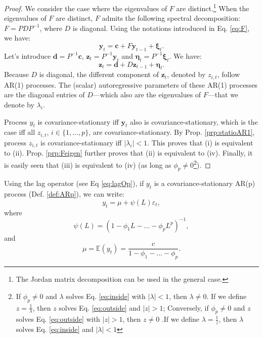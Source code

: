 \documentclass[
  11pt,
]{book}
\theoremstyle{definition}
\theoremstyle{definition}
\theoremstyle{definition}
\theoremstyle{definition}
\theoremstyle{remark}
\begin{document}
\begin{proof}
We consider the case where the eigenvalues of \(F\) are distinct.\footnote{The Jordan matrix decomposition can be used in the general case.} When the eigenvalues of \(F\) are distinct, \(F\) admits the following spectral decomposition: \(F = PDP^{-1}\), where \(D\) is diagonal. Using the notations introduced in Eq. \eqref{eq:F}, we have:
\[
\mathbf{y}_{t} = \mathbf{c} + F \mathbf{y}_{t-1} + \boldsymbol\xi_{t}.
\]
Let's introduce \(\mathbf{d} = P^{-1}\mathbf{c}\), \(\mathbf{z}_t = P^{-1}\mathbf{y}_t\) and \(\boldsymbol\eta_t = P^{-1}\boldsymbol\xi_t\). We have:
\[
\mathbf{z}_{t} = \mathbf{d} + D \mathbf{z}_{t-1} + \boldsymbol\eta_{t}.
\]
Because \(D\) is diagonal, the different component of \(\mathbf{z}_t\), denoted by \(z_{i,t}\), follow AR(1) processes. The (scalar) autoregressive parameters of these AR(1) processes are the diagonal entries of \(D\)---which also are the eigenvalues of \(F\)---that we denote by \(\lambda_i\).

Process \(y_t\) is covariance-stationary iff \(\mathbf{y}_{t}\) also is covariance-stationary, which is the case iff all \(z_{i,t}\), \(i \in \{1,\dots,p\}\), are covariance-stationary. By Prop. \ref{prp:statioAR1}, process \(z_{i,t}\) is covariance-stationary iff \(|\lambda_i|<1\). This proves that (i) is equivalent to (ii). Prop. \ref{prp:Feigen} further proves that (ii) is equivalent to (iv). Finally, it is easily seen that (iii) is equivalent to (iv) (as long as \(\phi_p \ne 0\)\footnote{If \(\phi_p \ne 0\) and \(\lambda\) solves Eq. \eqref{eq:inside} with \(|\lambda|<1\), then \(\lambda \ne 0\). If we define \(z=\frac{1}{\lambda}\), then \(z\) solves Eq. \eqref{eq:outside} and \(|z|>1\); Conversely, if \(\phi_p \ne 0\) and \(z\) solves Eq. \eqref{eq:outside} with \(|z|>1\), then \(z \ne 0\) .If we define \(\lambda=\frac{1}{z}\), then \(\lambda\) solves Eq. \eqref{eq:inside} and \(|\lambda|<1\)}).
\end{proof}

Using the lag operator (see Eq \eqref{eq:lagOp}), if \(y_t\) is a covariance-stationary AR(p) process (Def. \ref{def:ARp}), we can write:
\[
y_t = \mu + \psi(L)\varepsilon_t,
\]
where
\begin{equation}
\psi(L) = (1 - \phi_1 L - \dots - \phi_p L^p)^{-1},
\end{equation}
and
\begin{equation}
\mu = \mathbb{E}(y_t) = \dfrac{c}{1-\phi_1 -\dots - \phi_p}.\label{eq:EAR}
\end{equation}
\end{document}
